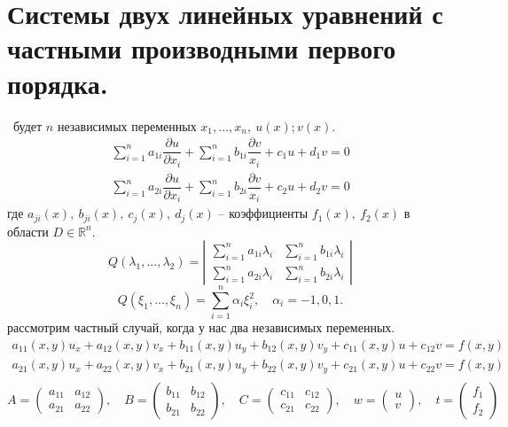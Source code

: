\documentclass[9pt]{article}
\begin{document}
\section{Системы двух линейных уравнений с частными производными первого порядка.}

\ 
 будет \(n\) независимых переменных \(x_1,...,x_n,\ u(x); v(x)\).
\begin{equation}
\begin{array}{l}
    \displaystyle\sum_{i=1}^na_{1i}\dfrac{\partial u}{\partial x_i}+\sum^n_{i=1}b_{1i}\dfrac{\partial v}{x_i}+c_1u+d_1v=0 \\
    \displaystyle\sum_{i=1}^na_{2i}\dfrac{\partial u}{\partial x_i}+\sum^n_{i=1}b_{2i}\dfrac{\partial v}{x_i}+c_2u+d_2v=0
\end{array}
\end{equation}
где \(a_{ji}(x),\ b_{ji}(x),\ c_j(x),\ d_j(x)\) -- коэффициенты \(f_1(x),\ f_2(x)\) в области \(D\in \mathbb R^n\).
\begin{equation}
    Q(\lambda_1,...,\lambda_2)=\displaystyle\left|
\begin{array}{cc}
    \sum^n_{i=1}a_{1i}\lambda_i & \sum^n_{i=1}b_{1i}\lambda_i \\
    \sum^n_{i=1}a_{2i}\lambda_i & \sum^n_{i=1}b_{2i}\lambda_i
\end{array}\right|
\end{equation}
\[Q(\xi_1,...,\xi_n)=\displaystyle\sum^n_{i=1}\alpha_i\xi_i^2,\quad \alpha_i=-1,0,1.\]
\parТеперь рассмотрим частный случай, когда у нас два независимых переменных.
\[
\begin{array}{l}
    a_{11}(x,y)u_x+a_{12}(x,y)v_x+b_{11}(x,y)u_y+b_{12}(x,y)v_y+c_{11}(x,y)u+c_{12}v=f(x,y) \\
    a_{21}(x,y)u_x+a_{22}(x,y)v_x+b_{21}(x,y)u_y+b_{22}(x,y)v_y+c_{21}(x,y)u+c_{22}v=f(x,y) \\
\end{array}
\]
\[A=\left(\begin{array}{cc}
    a_{11} & a_{12} \\
    a_{21} & a_{22}
\end{array}\right),\quad B=\left(\begin{array}{cc}
    b_{11} & b_{12} \\
    b_{21} & b_{22}
\end{array}\right),\quad C=\left(\begin{array}{cc}
    c_{11} & c_{12} \\
    c_{21} & c_{22}
\end{array}\right),\quad w=\left(\begin{array}{c}
    u \\
    v
\end{array}\right),\quad t=\left(\begin{array}{c}
    f_1 \\
    f_2
\end{array}\right)\]
\end{document}
